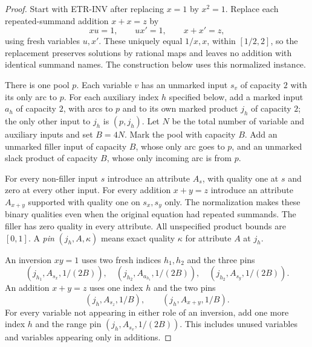 \begin{proof}
Start with \textsc{ETR-INV} after replacing $x=1$ by $x^2=1$. Replace
each repeated-summand addition $x+x=z$ by
\[
 xu=1,\qquad ux'=1,\qquad x+x'=z,
\]
using fresh variables $u,x'$. These uniquely equal $1/x,x$, within
$[1/2,2]$, so the replacement preserves solutions by rational maps and
leaves no addition with identical summand names. The construction below
uses this normalized instance.

There is one pool $p$. Each variable $v$ has an unmarked input $s_v$
of capacity $2$ with its only arc to $p$. For each auxiliary index $h$
specified below, add a marked input $a_h$ of capacity $2$, with arcs
to $p$ and to its own marked product $j_h$ of capacity $2$; the only
other input to $j_h$ is $(p,j_h)$. Let $N$ be the total number of
variable and auxiliary inputs and set $B=4N$. Mark the pool with
capacity $B$. Add an unmarked filler input of capacity $B$, whose
only arc goes to $p$, and an unmarked slack product of capacity $B$,
whose only incoming arc is from $p$.

For every non-filler input $s$ introduce an attribute $A_s$, with quality
one at $s$ and zero at every other input. For every addition $x+y=z$
introduce an attribute $A_{x+y}$ supported with quality one on
$s_x,s_y$ only. The normalization makes these binary qualities even
when the original equation had repeated summands. The filler has zero
quality in every attribute. All unspecified product bounds are $[0,1]$.
A \emph{pin} $(j_h,A,\kappa)$ means exact quality $\kappa$ for
attribute $A$ at $j_h$.

An inversion $xy=1$ uses two fresh indices $h_1,h_2$ and the three pins
\begin{equation}
 (j_{h_1},A_{s_x},1/(2B)),\quad
 (j_{h_2},A_{a_{h_1}},1/(2B)),\quad
 (j_{h_2},A_{s_y},1/(2B)).\label{s2:one-inversion-pins}
\end{equation}
An addition $x+y=z$ uses one index $h$ and the two pins
\begin{equation}
 (j_h,A_{s_z},1/B),\qquad(j_h,A_{x+y},1/B).
 \label{s2:one-addition-pins}
\end{equation}
For every variable not appearing in either role of an inversion, add
one more index $h$ and the range pin $(j_h,A_{s_v},1/(2B))$.
This includes unused variables and variables appearing only in additions.


\end{proof}
